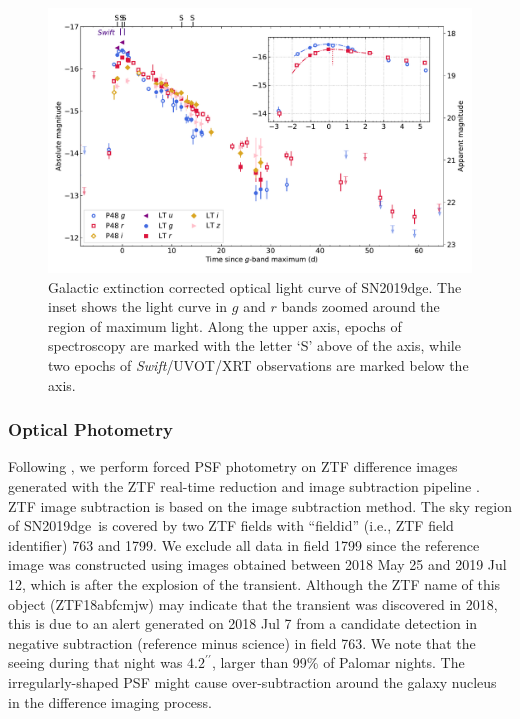 \documentclass[twocolumn]{aastex63}
\newcommand{\name}{SN2019dge}
\newcommand{\swift}{\textit{Swift}}
\begin{document}
\begin{figure}[htbp!]
	\centering
	\includegraphics[width=\textwidth]{figures/lightcurve.pdf}
	\caption{Galactic extinction corrected optical light curve of \name. The inset shows 
		the light curve in $g$ and $r$ bands zoomed around the region of maximum light. Along the 
		upper axis, epochs of spectroscopy are marked with the letter `S' above of the axis, while two 
		epochs of \swift/UVOT/XRT observations are marked below the axis.\label{fig:lightcurve}}
\end{figure}
\subsubsection{Optical Photometry}
Following \citet{Yao2019}, we perform forced PSF photometry on ZTF difference 
images generated with the ZTF real-time reduction and image subtraction pipeline \citep{Masci2019}. 
ZTF image subtraction is based on the \citet{Zackay2016} image subtraction method. The sky region of 
\name\ is covered by two ZTF fields with ``fieldid'' (i.e., ZTF field 
identifier) 763 and 1799. We exclude all data in field 1799 since the reference image was constructed 
using images obtained between 2018 May 25 and 2019 Jul 12, which is after the explosion of the 
transient. Although the ZTF name of this object (ZTF18abfcmjw) may indicate that the transient was 
discovered in 2018, this is due to an alert generated on 2018 Jul 7 from a candidate detection in 
negative subtraction (reference minus science) in field 763. We note that the seeing during that night 
was $4.2^{\prime\prime}$, larger than 99\% of Palomar nights. The irregularly-shaped PSF might cause 
over-subtraction around the galaxy nucleus in the difference imaging process.
\end{document}
